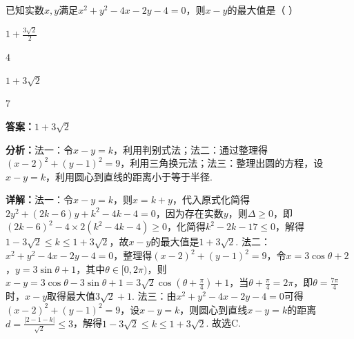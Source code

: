 \begin{question}[points=5]
已知实数$x,y$满足$x^2+y^2-4x-2y-4=0$，则$x-y$的最大值是（   ）
\begin{choices}
  \item $1+\frac{3\sqrt{2}}{2}$
  \item $4$
  \item $1+3\sqrt{2}$
  \item $7$
\end{choices}
\begin{solution}
\textbf{答案：}$1+3\sqrt{2}$

\textbf{分析：}法一：令$x-y=k$，利用判别式法；法二：通过整理得$(x-2)^2+(y-1)^2=9$，利用三角换元法；法三：整理出圆的方程，设$x-y=k$，利用圆心到直线的距离小于等于半径.

\textbf{详解：}法一：令$x-y=k$，则$x=k+y$，代入原式化简得$2y^2+(2k-6)y+k^2-4k-4=0$，因为存在实数$y$，则$\Delta\ge0$，即$(2k-6)^2-4\times2(k^2-4k-4)\ge0$，化简得$k^2-2k-17\le0$，解得$1-3\sqrt2\le k\le1+3\sqrt2$，故$x-y$的最大值是$1+3\sqrt2$.
法二：$x^2+y^2-4x-2y-4=0$，整理得$(x-2)^2+(y-1)^2=9$，令$x=3\cos\theta+2$，$y=3\sin\theta+1$，其中$\theta\in[0,2\pi)$，则$x-y=3\cos\theta-3\sin\theta+1=3\sqrt2\cos(\theta+\frac{\pi}{4})+1$，当$\theta+\frac{\pi}{4}=2\pi$，即$\theta=\frac{7\pi}{4}$时，$x-y$取得最大值$3\sqrt2+1$.
法三：由$x^2+y^2-4x-2y-4=0$可得$(x-2)^2+(y-1)^2=9$，设$x-y=k$，则圆心到直线$x-y=k$的距离$d=\frac{|2-1-k|}{\sqrt2}\le3$，解得$1-3\sqrt2\le k\le1+3\sqrt2$. 故选C.
\end{solution}
\end{question}

